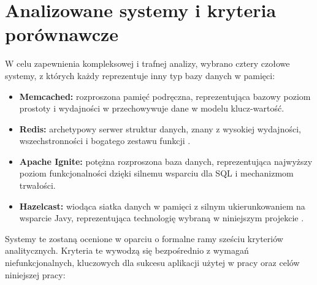 \section{Analizowane systemy i kryteria porównawcze}

W celu zapewnienia kompleksowej i trafnej analizy, wybrano cztery czołowe systemy, z których każdy reprezentuje inny typ bazy danych w pamięci:
\begin{itemize}
    \item \textbf{Memcached:} rozproszona pamięć podręczna, reprezentująca bazowy poziom prostoty i wydajności w przechowywuje dane w modelu klucz-wartość\cite{memcached-docs}.
    \item \textbf{Redis:} archetypowy serwer struktur danych, znany z wysokiej wydajności, wszechstronności i bogatego zestawu funkcji \cite{redis-docs}.
    \item \textbf{Apache Ignite:} potężna rozproszona baza danych, reprezentująca najwyższy poziom funkcjonalności dzięki silnemu wsparciu dla SQL i mechanizmom trwałości\cite{ignite-docs}.
    \item \textbf{Hazelcast:} wiodąca siatka danych w pamięci z silnym ukierunkowaniem na wsparcie Javy, reprezentująca technologię wybraną w niniejszym projekcie \cite{hazelcast-docs}.
\end{itemize}

Systemy te zostaną ocenione w oparciu o formalne ramy sześciu kryteriów analitycznych. Kryteria te wywodzą się bezpośrednio z wymagań niefunkcjonalnych, kluczowych dla sukcesu aplikacji użytej w pracy oraz celów niniejszej pracy:

